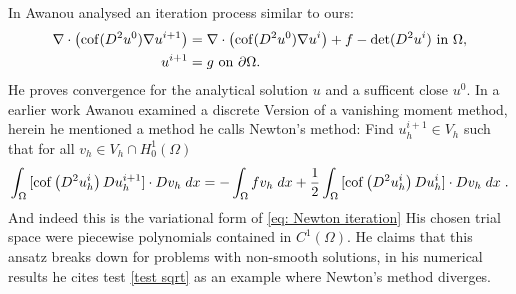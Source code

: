 In \cite{Awanou2014} Awanou analysed an iteration process similar to ours:
\begin{align}
	\nabla \cdot \left( \operatorname{cof}(D^2 u^0) \nabla u^{i+1} \right) &= \nabla \cdot \left( \operatorname{cof}(D^2 u^0) \nabla u^{i} \right) + f - \operatorname{det} (D^2u^i) \textnormal{ in } \Omega,  \label{eq: Awanout eq}\\
	u^{i+1} &= g \textnormal{ on } \partial \Omega.
\end{align}
He proves convergence for the analytical solution $u$ and a sufficent close $u^0$. 
In a earlier work \cite{Awanou2010} Awanou examined a discrete Version of a vanishing moment method, herein he mentioned a method he calls Newton's method: Find $u_h^{i+1}\in V_h$ such that for all $v_h \in V_h \cap H^1_0 (\Omega)$
\[
	\int_{\Omega} {{[\operatorname{cof} \left(  D^2 u_h^i \right) Du_h^{i+1}] \cdot Dv_h}\;dx} 
	= -	\int_{\Omega} {{f v_h}\;dx} 
		+ \frac 1 2 \int_{\Omega} {{[\operatorname{cof} \left(  D^2 u_h^i \right) Du_h^{i}] \cdot Dv_h}\;dx} \;  \label{eq: Awanout eq2}.
\]
And indeed this is the variational form of \eqref{eq: Newton iteration}
His chosen trial space were piecewise polynomials contained in $C^1(\Omega)$. He claims that this ansatz breaks down for problems with non-smooth solutions, in his numerical results he cites test \ref{test sqrt} as an example where Newton's method diverges.


